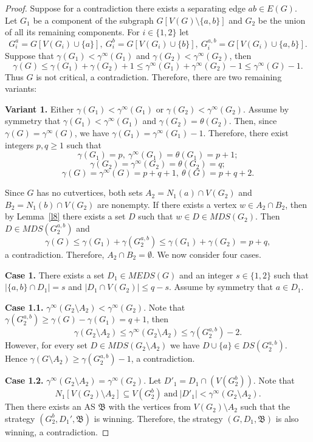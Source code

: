 \documentclass[12pt]{article}
\begin{document}
\begin{proof}
Suppose for a contradiction there exists a separating edge $ab \in E(G)$. Let $G_1$ be a component of the subgraph $G[V(G) \setminus \{a,b\}]$ and $G_2$ be the union of all its remaining components. For $i \in \{1,2\}$ let $$G^a_i = G[V(G_i) \cup \{a\}], \ G^b_i = G[V(G_i) \cup \{b\}], \  G^{a,b}_i = G[V(G_i) \cup \{a,b\}].$$ Suppose that $\gamma(G_1) < \gamma^{\infty}(G_1)$ and $\gamma(G_2) < \gamma^{\infty}(G_2)$, then  $$\gamma(G) \leq \gamma(G_1) + \gamma(G_2) + 1 \leq \gamma^{\infty}(G_1) + \gamma^{\infty}(G_2) - 1 \leq  \gamma^{\infty}(G) - 1.$$ Thus $G$ is not critical, a contradiction. Therefore, there are two remaining variants:

\textbf{Variant 1.} Either $\gamma(G_1) < \gamma^{\infty}(G_1)$ or $\gamma(G_2) < \gamma^{\infty}(G_2)$. Assume by symmetry that $\gamma(G_1) < \gamma^{\infty}(G_1)$ and $\gamma(G_2) = \theta(G_2)$. Then, since $\gamma(G) = \gamma^{\infty}(G)$, we have $\gamma(G_1) = \gamma^{\infty}(G_1) - 1$. Therefore, there exist integers $p,q \geq 1$ such that $$\gamma(G_1) = p, \ \gamma^{\infty}(G_1) = \theta(G_1) = p + 1;$$ $$\gamma(G_2) = \gamma^{\infty}(G_2) = \theta(G_2) = q;$$ $$\gamma(G) = \gamma^{\infty}(G) = p + q + 1, \ \theta(G) = p + q + 2.$$

Since $G$ has no cutvertices, both sets $A_2 = N_1(a) \cap V(G_2)$ and $B_2 = N_1(b) \cap V(G_2)$ are nonempty. If there exists a vertex $w \in A_2 \cap B_2$, then by Lemma~\ref{l8} there exists a set $D$ such that $w \in D \in MDS(G_2)$. Then $D \in MDS(G^{a,b}_2)$ and $$\gamma(G) \leq \gamma(G_1) + \gamma(G^{a,b}_2) \leq \gamma(G_1) + \gamma(G_2) = p + q,$$ a contradiction. Therefore, $A_2 \cap B_2 = \emptyset$. We now consider four cases.

\textbf{Case 1.} There exists a set $D_1 \in MEDS(G)$ and an integer $s \in \{1,2\}$ such that $|\{a,b\} \cap D_1| = s $ and $|D_1 \cap V(G_2)| \leq q-s$. Assume by symmetry that $a \in D_1$. 

\textbf{Case 1.1.} $\gamma^{\infty}(G_2 \setminus A_2) < \gamma^{\infty}(G_2)$. Note that $\gamma(G^{a,b}_2) \geq \gamma(G) - \gamma(G_1) = q + 1$, then $$\gamma(G_2 \setminus A_2) \leq \gamma^{\infty}(G_2 \setminus A_2) \leq \gamma(G^{a,b}_2)- 2.$$ However, for every set $D \in MDS(G_2 \setminus A_2)$ we have $D \cup \{a\} \in DS(G^{a,b}_2)$. Hence $\gamma(G \setminus A_2) \geq \gamma(G^{a,b}_2) - 1$, a contradiction.

\textbf{Case 1.2.} $\gamma^{\infty}(G_2 \setminus A_2) = \gamma^{\infty}(G_2)$. Let $D'_1 = D_1 \cap (V(G^b_2))$. Note that $$N_1[V(G_2) \setminus A_2] \subseteq V(G^b_2) \ \text{and} \ |D'_1| < \gamma^{\infty}(G_2 \setminus A_2).$$ Then there exists an AS $\mathfrak{B}$ with the vertices from $V(G_2) \setminus A_2$ such that the strategy $(G_2^b,D_1',\mathfrak{B})$ is winning. Therefore, the strategy $(G,D_1,\mathfrak{B})$ is also winning, a contradiction. 


\end{proof}
\end{document}
